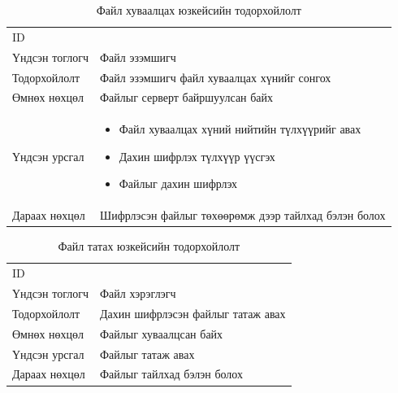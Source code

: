 \begin{table}[H]
    \footnotesize
    \centering
    \begin{tabularx}{\textwidth}{|>{\hsize=0.3\hsize}X|>{\hsize=0.7\hsize}X|}
        \hline
        \multicolumn{2}{|c|}{Файл хуваалцах}                                 \\
        \hline
        ID             & 5                                                   \\
        \hline
        Үндсэн тоглогч & Файл эзэмшигч                                       \\
        \hline
        Тодорхойлолт   & Файл эзэмшигч файл хуваалцах хүнийг сонгох          \\
        \hline
        Өмнөх нөхцөл   & Файлыг серверт байршуулсан байх                     \\
        \hline
        Үндсэн урсгал  &
        \begin{minipage}{\linewidth}
            \begin{itemize}
                \item Файл хуваалцах хүний нийтийн түлхүүрийг авах
                \item Дахин шифрлэх түлхүүр үүсгэх
                \item Файлыг дахин шифрлэх
            \end{itemize}
        \end{minipage}
        \\
        \hline
        Дараах нөхцөл  & Шифрлэсэн файлыг төхөөрөмж дээр тайлхад бэлэн болох \\
        \hline
    \end{tabularx}
    \caption{Файл хуваалцах юзкейсийн тодорхойлолт}
\end{table}

\begin{table}[H]
    \footnotesize
    \centering
    \begin{tabularx}{\textwidth}{|>{\hsize=0.3\hsize}X|>{\hsize=0.7\hsize}X|}
        \hline
        \multicolumn{2}{|c|}{Файл татах}                   \\
        \hline
        ID             & 6                                 \\
        \hline
        Үндсэн тоглогч & Файл хэрэглэгч                    \\
        \hline
        Тодорхойлолт   & Дахин шифрлэсэн файлыг татаж авах \\
        \hline
        Өмнөх нөхцөл   & Файлыг хуваалцсан байх            \\
        \hline
        Үндсэн урсгал  & Файлыг татаж авах                 \\
        \hline
        Дараах нөхцөл  & Файлыг тайлхад бэлэн болох        \\
        \hline
    \end{tabularx}
    \caption{Файл татах юзкейсийн тодорхойлолт}
\end{table}

